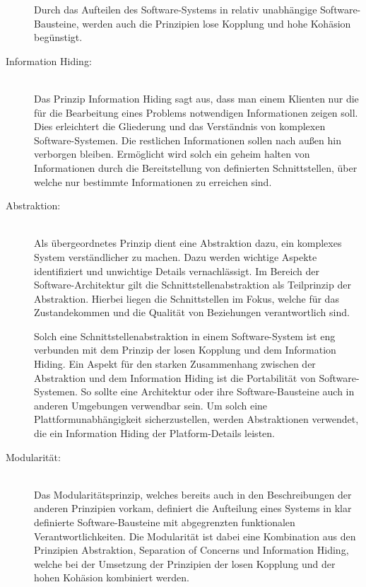 \begin{description}
    Durch das Aufteilen des Software-Systems in relativ unabhängige Software-Bausteine, werden auch die Prinzipien lose Kopplung und hohe Kohäsion begünstigt.

    \item[Information Hiding:]\hfill \\
    Das Prinzip Information Hiding sagt aus, dass man einem Klienten nur die für die Bearbeitung eines Problems notwendigen Informationen zeigen soll. Dies erleichtert die Gliederung und das Verständnis von komplexen Software-Systemen. Die restlichen Informationen sollen nach außen hin verborgen bleiben. Ermöglicht wird solch ein \glqq geheim halten\grqq{} von Informationen durch die Bereitstellung von definierten Schnittstellen, über welche nur bestimmte Informationen zu erreichen sind.

    \item[Abstraktion:]\hfill \\
    Als übergeordnetes Prinzip dient eine Abstraktion dazu, ein komplexes System verständlicher zu machen. Dazu werden wichtige Aspekte identifiziert und unwichtige Details vernachlässigt. Im Bereich der Software-Architektur gilt die Schnittstellenabstraktion als Teilprinzip der Abstraktion. Hierbei liegen die Schnittstellen im Fokus, welche für das Zustandekommen und die Qualität von Beziehungen verantwortlich sind.

    Solch eine Schnittstellenabstraktion in einem Software-System ist eng verbunden mit dem Prinzip der losen Kopplung und dem Information Hiding. Ein Aspekt für den starken Zusammenhang zwischen der Abstraktion und dem Information Hiding ist die Portabilität von Software-Systemen. So sollte eine Architektur oder ihre Software-Bausteine auch in anderen Umgebungen verwendbar sein. Um solch eine Plattformunabhängigkeit sicherzustellen, werden Abstraktionen verwendet, die ein Information Hiding der Platform-Details leisten.

    \item[Modularität:]\hfill \\
    Das Modularitätsprinzip, welches bereits auch in den Beschreibungen der anderen Prinzipien vorkam, definiert die Aufteilung eines Systems in klar definierte Software-Bausteine mit abgegrenzten funktionalen Verantwortlichkeiten. Die Modularität ist dabei eine Kombination aus den Prinzipien Abstraktion, Separation of Concerns und Information Hiding, welche bei der Umsetzung der Prinzipien der losen Kopplung und der hohen Kohäsion kombiniert werden.

\end{description}

